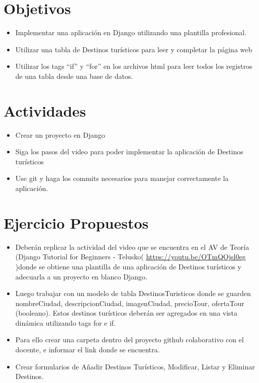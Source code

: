 \documentclass{article}
\begin{document}
\section{Objetivos}
	\begin{itemize}		
		\item Implementar una aplicación en Django utilizando una plantilla profesional.
		\item Utilizar una tabla de Destinos turísticos para leer y completar la página web
		\item Utilizar los tags “if” y “for” en los archivos html para leer todos los registros de una tabla desde una base de datos.

	\end{itemize}
\section{Actividades}
	\begin{itemize}		
		\item Crear un proyecto en Django
		\item Siga los pasos del video para poder implementar la aplicación de Destinos turísticos
		\item Use git y haga los commits necesarios para manejar correctamente la aplicación.
	\end{itemize}
\section{Ejercicio Propuestos}
	\begin{itemize}		
		\item Deberán replicar la actividad del video que se encuentra en el AV de Teoría (Django Tutorial for Beginners - Telusko( \url{https://youtu.be/OTmQOjsl0eg} )donde se obtiene una plantilla de una aplicación de Destinos turísticos y adecuarla a un proyecto en blanco Django.
		\item Luego trabajar con un modelo de tabla DestinosTuristicos donde se guarden nombreCiudad,  descripcionCiudad, imagenCiudad, precioTour, ofertaTour (booleano).  Estos destinos turísticos deberán ser agregados en una vista dinámica utilizando tags for e if.
		\item Para ello crear una carpeta dentro del proyecto github colaborativo con el docente, e informar el link donde se encuentra.
		\item Crear formularios de Añadir Destinos Turísticos, Modificar, Listar y Eliminar Destinos.  
	\end{itemize}
\end{document}
